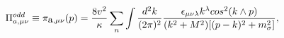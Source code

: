 \begin{equation}
\Pi^{odd}_{a,{\mu\nu}} \equiv {\cal{\pi}}_{\mbox{a},\mu \nu}
(p)=\frac{8 v^2}{\kappa} \sum_{n} \int \frac{d^2 k}{(2 \pi)^2}
\frac{\epsilon_{\mu \nu\lambda} k^{\lambda} cos^2(k \wedge p)}{(k^2 +
M^2)[(p-k)^2 + m^2_{\sigma}]},
\end{equation}

